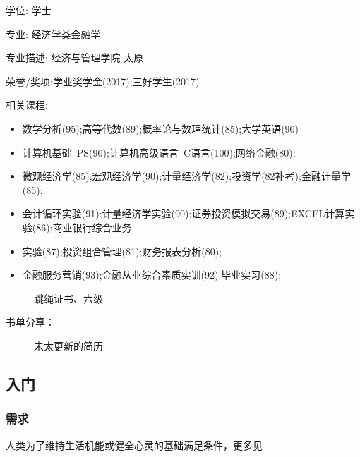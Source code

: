 \documentclass[letterpaper,11pt,english]{sphinxmanual}
\begin{document}
学位: 学士

专业: 经济学类\sphinxhyphen{}金融学

专业描述: 经济与管理学院 太原

荣誉/奖项:学业奖学金(2017);三好学生(2017)

相关课程:
\begin{itemize}
\item {} 
数学分析(95);高等代数(89);概率论与数理统计(85);大学英语(90)

\item {} 
计算机基础–PS(90);计算机高级语言–C语言(100);网络金融(80);

\item {} 
微观经济学(85);宏观经济学(90);计量经济学(82);投资学(82补考);金融计量学(85);

\item {} 
会计循环实验(91);计量经济学实验(90);证券投资模拟交易(89);EXCEL计算实验(86);商业银行综合业务

\item {} 
实验(87);投资组合管理(81);财务报表分析(80);

\item {} 
金融服务营销(93);金融从业综合素质实训(92);毕业实习(88);

\end{itemize}

\begin{figure}[H]
\centering
\capstart

\noindent{}
\caption{跳绳证书、六级}\label{\detokenize{get_started:id17}}\end{figure}

书单分享： 

\begin{figure}[H]
\centering
\capstart

\noindent{}
\caption{未太更新的简历}\label{\detokenize{get_started:id18}}\end{figure}


\subsection{入门}
\label{\detokenize{chapter_introduction/index:chap-intro}}\label{\detokenize{chapter_introduction/index:id1}}\label{\detokenize{chapter_introduction/index::doc}}

\subsubsection{需求}
\label{\detokenize{chapter_introduction/need:id1}}\label{\detokenize{chapter_introduction/need::doc}}
人类为了维持生活机能或健全心灵的基础满足条件，更多见%
\begin{footnote}[3]\sphinxAtStartFootnote
{}
%
\end{footnote}
\end{document}
